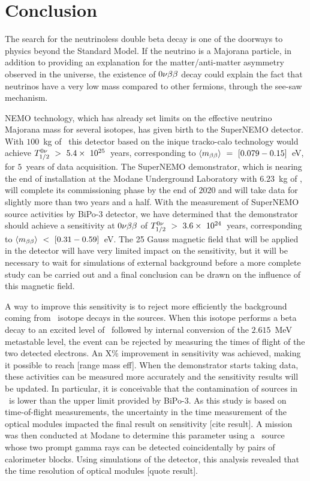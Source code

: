 \chapter*{Conclusion}
\label{ch:conclu}

The search for the neutrinoless double beta decay is one of the doorways to physics beyond the Standard Model.
If the neutrino is a Majorana particle, in addition to providing an explanation for the matter/anti-matter asymmetry observed in the universe, the existence of $0\nu\beta\beta$ decay could explain the fact that neutrinos have a very low mass compared to other fermions, through the see-saw mechanism.

NEMO technology, which has already set limits on the effective neutrino Majorana mass for several isotopes, has given birth to the SuperNEMO detector.
With $100$~kg of \Se\ this detector based on the inique tracko-calo technology would achieve $T_{1/2}^{0\nu}~>~5.4\times~10^{25}$~years, corresponding to $\langle m_{\beta\beta}\rangle~=~[0.079-0.15]$~eV, for $5$~years of data acquisition.
The SuperNEMO demonstrator, which is nearing the end of installation at the Modane Underground Laboratory with $6.23$~kg of \Se, will complete its commissioning phase by the end of $2020$ and will take data for slightly more than two years and a half.
With the measurement of SuperNEMO source activities by BiPo-$3$ detector, we have determined that the demonstrator should achieve a sensitivity at $0\nu\beta\beta$ of $T_{1/2}^{0\nu}~>~3.6\times~10^{24}$~years, corresponding to $\langle m_{\beta\beta}\rangle~<~[0.31-0.59]$~eV.
The 25 Gauss magnetic field that will be applied in the detector will have very limited impact on the sensitivity, but it will be necessary to wait for simulations of external background before a more complete study can be carried out and a final conclusion can be drawn on the influence of this magnetic field.

A way to improve this sensitivity is to reject more efficiently the background coming from \Tl\ isotope decays in the sources.
When this isotope performs a beta decay to an excited level of \Pb\ followed by internal conversion of the $2.615$~MeV metastable level, the event can be rejected by measuring the times of flight of the two detected electrons.
An X\% improvement in sensitivity was achieved, making it possible to reach [range mass eff].
When the demonstrator starts taking data, these activities can be measured more accurately and the sensitivity results will be updated.
In particular, it is conceivable that the contamination of sources in \Bi\ is lower than the upper limit provided by BiPo-$3$.
As this study is based on time-of-flight measurements, the uncertainty in the time measurement of the optical modules impacted the final result on sensitivity [cite result].
A mission was then conducted at Modane to determine this parameter using a \Co\ source whose two prompt gamma rays can be detected coincidentally by pairs of calorimeter blocks.
Using simulations of the detector, this analysis revealed that the time resolution of optical modules [quote result].

